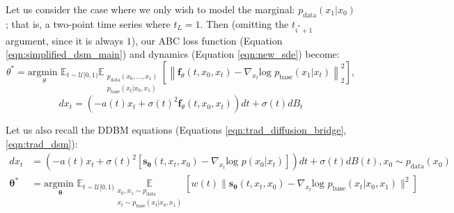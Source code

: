 \documentclass{article}
\begin{document}
Let us consider the case where we only wish to model the marginal: $p_\text{data}(x_1 | x_0)$; that is, a two-point time series where $t_L = 1$.
Then (omitting the $t_{i^*+1}$ argument, since it is always $1$), our ABC loss function (Equation \ref{eqn:simplified_dsm_main}) and dynamics (Equation \ref{eqn:new_sde}) become:
\begin{equation}\label{eqn:two_point_loss}
    \theta^* = \underset{\theta}{\text{argmin }} \displaystyle \mathbb{E}_{t \sim \mathcal{U}[0, 1)} \mathbb{E}_{\substack{p_\text{data}(x_0, \ldots, x_1) \\ p_\text{base}(x_t | x_0, x_1)}} \left[\left\|\mathbf{f}_\theta(t, x_0, x_t) - \nabla_{x_t} \text{log }p_\text{base}(x_1 | x_t)\right\|_2^2\right],
\end{equation}
\begin{equation}\label{eqn:two_point_dynamics}
    dx_t = \left(-a(t)x_t + \sigma(t)^2 \mathbf{f}_\theta(t, x_0, x_t)\right)dt + \sigma(t)dB_t
\end{equation}

Let us also recall the DDBM equations (Equations \ref{eqn:trad_diffusion_bridge}, \ref{eqn:trad_dsm}):
\begin{align}
    dx_t &= \left(-a(t)x_t + \sigma(t)^2 \left[\mathbf{s_\theta}(t, x_t, x_0) - \nabla_{x_t}\text{log } p(x_0 | x_t)\right]\right)dt + \sigma(t)dB(t), x_0 \sim p_\text{data}(x_0) \nonumber \\
    \mathbf{\theta^*} &= \underset{\mathbf{\theta}}{\text{argmin }}\mathbb{E}_{t \sim \mathcal{U}[0, 1)}\underset{\substack{x_0, x_1 \sim p_\text{data} \\ x_t \sim p_\text{base}(x_t | x_0, x_1)}}{\mathbb{E}}\left[w(t)\|\mathbf{s_\theta}(t, x_t, x_0) - \nabla_{x_t}\text{log } p_\text{base}(x_t | x_0, x_1)\|^2\right] \nonumber
\end{align}
\end{document}
